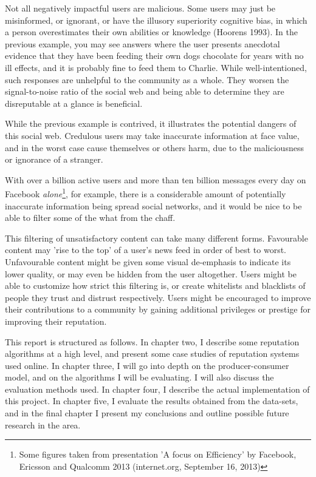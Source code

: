 \documentclass[]{final_report}
\begin{document}
Not all negatively impactful users are malicious. Some users may just be misinformed, or ignorant, or have the illusory superiority cognitive bias, in which a person overestimates their own abilities or knowledge (Hoorens 1993). In the previous example, you may see answers where the user presents anecdotal evidence that they have been feeding their own dogs chocolate for years with no ill effects, and it is probably fine to feed them to Charlie. While well-intentioned, such responses are unhelpful to the community as a whole. They worsen the signal-to-noise ratio of the social web and being able to determine they are disreputable at a glance is beneficial.

While the previous example is contrived, it illustrates the potential dangers of this social web. Credulous users may take inaccurate information at face value, and in the worst case cause themselves or others harm, due to the maliciousness or ignorance of a stranger.

With over a billion active users and more than ten billion messages every day on Facebook \textsl{alone}\footnote{Some figures taken from presentation 'A focus on Efficiency' by Facebook, Ericsson and Qualcomm 2013 (internet.org, September 16, 2013)}, for example, there is a considerable amount of potentially inaccurate information being spread social networks, and it would be nice to be able to filter some of the what from the chaff.

This filtering of unsatisfactory content can take many different forms. Favourable content may 'rise to the top' of a user's news feed in order of best to worst. Unfavourable content might be given some visual de-emphasis to indicate its lower quality, or may even be hidden from the user altogether. Users might be able to customize how strict this filtering is, or create whitelists and blacklists of people they trust and distrust respectively. Users might be encouraged to improve their contributions to a community by gaining additional privileges or prestige for improving their reputation.

This report is structured as follows. In chapter two, I describe some reputation algorithms at a high level, and present some case studies of reputation systems used online. In chapter three, I will go into depth on the producer-consumer model, and on the algorithms I will be evaluating. I will also discuss the evaluation methods used. In chapter four, I describe the actual implementation of this project. In chapter five, I evaluate the results obtained from the data-sets, and in the final chapter I present my conclusions and outline possible future research in the area.
\end{document}
